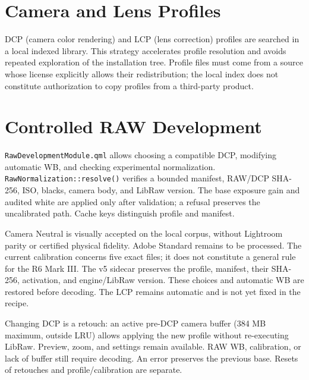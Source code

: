 \section{Camera and Lens Profiles}

DCP (camera color rendering) and LCP (lens correction) profiles are searched in a local indexed library. This strategy accelerates profile resolution and avoids repeated exploration of the installation tree. Profile files must come from a source whose license explicitly allows their redistribution; the local index does not constitute authorization to copy profiles from a third-party product.

\section{Controlled RAW Development}

\texttt{RawDevelopmentModule.qml} allows choosing a compatible DCP, modifying automatic WB, and checking experimental normalization. \texttt{RawNormalization::resolve()} verifies a bounded manifest, RAW/DCP SHA-256, ISO, blacks, camera body, and LibRaw version. The base exposure gain and audited white are applied only after validation; a refusal preserves the uncalibrated path. Cache keys distinguish profile and manifest.

Camera Neutral is visually accepted on the local corpus, without Lightroom parity or certified physical fidelity. Adobe Standard remains to be processed. The current calibration concerns five exact files; it does not constitute a general rule for the R6 Mark III. The v5 sidecar preserves the profile, manifest, their SHA-256, activation, and engine/LibRaw version. These choices and automatic WB are restored before decoding. The LCP remains automatic and is not yet fixed in the recipe.

Changing DCP is a retouch: an active pre-DCP camera buffer (384 MB maximum, outside LRU) allows applying the new profile without re-executing LibRaw. Preview, zoom, and settings remain available. RAW WB, calibration, or lack of buffer still require decoding. An error preserves the previous base. Resets of retouches and profile/calibration are separate.
